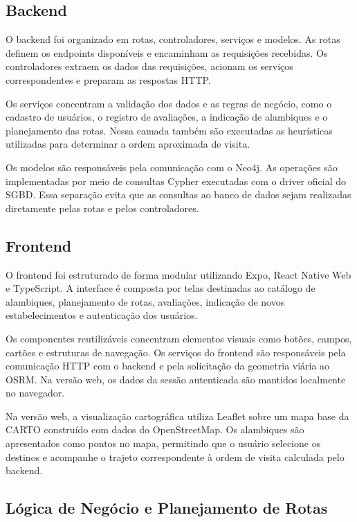 \documentclass{jaes}
\begin{document}
\subsection{Backend}

O backend foi organizado em rotas, controladores, serviços e modelos. As rotas definem os endpoints disponíveis e encaminham as requisições recebidas. Os controladores extraem os dados das requisições, acionam os serviços correspondentes e preparam as respostas HTTP.

Os serviços concentram a validação dos dados e as regras de negócio, como o cadastro de usuários, o registro de avaliações, a indicação de alambiques e o planejamento das rotas. Nessa camada também são executadas as heurísticas utilizadas para determinar a ordem aproximada de visita.

Os modelos são responsáveis pela comunicação com o Neo4j. As operações são implementadas por meio de consultas Cypher executadas com o driver oficial do SGBD. Essa separação evita que as consultas ao banco de dados sejam realizadas diretamente pelas rotas e pelos controladores.

\subsection{Frontend}

O frontend foi estruturado de forma modular utilizando Expo, React Native Web e TypeScript. A interface é composta por telas destinadas ao catálogo de alambiques, planejamento de rotas, avaliações, indicação de novos estabelecimentos e autenticação dos usuários.

Os componentes reutilizáveis concentram elementos visuais como botões, campos, cartões e estruturas de navegação. Os serviços do frontend são responsáveis pela comunicação HTTP com o backend e pela solicitação da geometria viária ao OSRM. Na versão web, os dados da sessão autenticada são mantidos localmente no navegador.

Na versão web, a visualização cartográfica utiliza Leaflet sobre um mapa base da CARTO construído com dados do OpenStreetMap. Os alambiques são apresentados como pontos no mapa, permitindo que o usuário selecione os destinos e acompanhe o trajeto correspondente à ordem de visita calculada pelo backend.

\subsection{Lógica de Negócio e Planejamento de Rotas}
\end{document}

